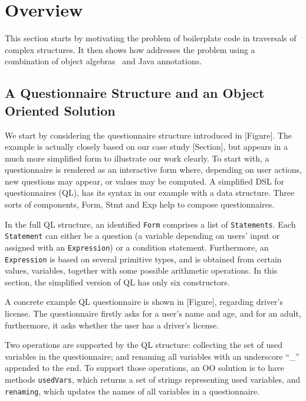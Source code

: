 \section{Overview}\label{subsec:overview}

This section starts by motivating the problem of boilerplate code in
traversals of complex structures. It then shows how \name addresses
the problem using a combination of object algebras~\cite{bruno12oa}
and Java annotations.

\subsection{A Questionnaire Structure and an Object Oriented Solution}



We start by considering the questionnaire structure introduced in [Figure]. The example is actually closely based on our case study [Section], but appears in a much more simplified form to illustrate our work clearly. To start with, a questionnaire is rendered as an interactive form where, depending on user actions, new questions may appear, or values may be computed. A simplified DSL for questionnaires (QL), has its syntax in our example with a data structure. Three sorts of components, Form, Stmt and Exp help to compose questionnaires.

In the full QL structure, an identified \lstinline{Form} comprises a list of \lstinline{Statements}. Each \lstinline{Statement} can either be a question (a variable depending on users' input or assigned with an \lstinline{Expression}) or a condition statement. Furthermore, an \lstinline{Expression} is based on several primitive types, and is obtained from certain values, variables, together with some possible arithmetic operations. In this section, the simplified version of QL has only six constructors.

A concrete example QL questionnaire is shown in [Figure], regarding driver's license. The questionnaire firstly asks for a user's name and age, and for an adult, furthermore, it asks whether the user has a driver's license.

Two operations are supported by the QL structure: collecting the set of used variables in the questionnaire; and renaming all variables with an underscore ``\_'' appended to the end. To support those operations, an OO solution is to have methods \lstinline{usedVars}, which returns a set of strings representing used variables, and \lstinline{renaming}, which updates the names of all variables in a questionnaire.

